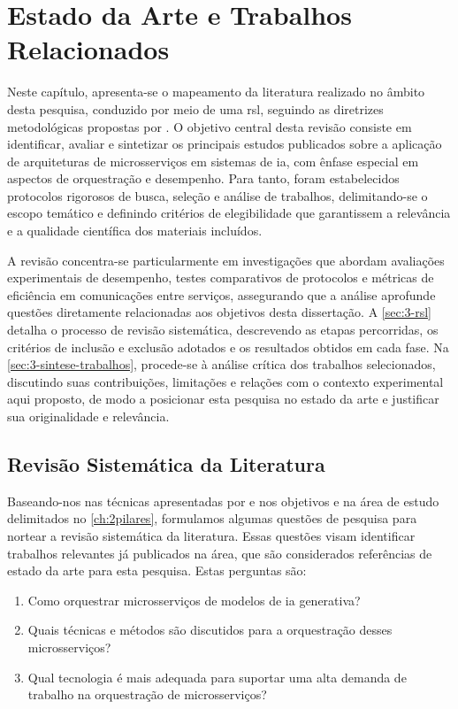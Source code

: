 \chapter{Estado da Arte e Trabalhos Relacionados}
\label{ch:3estado_da_arte}

Neste capítulo, apresenta-se o mapeamento da literatura realizado no âmbito desta pesquisa, conduzido por meio de uma \acrfull{rsl}, seguindo as diretrizes metodológicas propostas por \textcite{scannavino_revisao_2017}. O objetivo central desta revisão consiste em identificar, avaliar e sintetizar os principais estudos publicados sobre a aplicação de arquiteturas de microsserviços em sistemas de \acrfull{ia}, com ênfase especial em aspectos de orquestração e desempenho. Para tanto, foram estabelecidos protocolos rigorosos de busca, seleção e análise de trabalhos, delimitando-se o escopo temático e definindo critérios de elegibilidade que garantissem a relevância e a qualidade científica dos materiais incluídos.

A revisão concentra-se particularmente em investigações que abordam avaliações experimentais de desempenho, testes comparativos de protocolos e métricas de eficiência em comunicações entre serviços, assegurando que a análise aprofunde questões diretamente relacionadas aos objetivos desta dissertação. A \autoref{sec:3-rsl} detalha o processo de revisão sistemática, descrevendo as etapas percorridas, os critérios de inclusão e exclusão adotados e os resultados obtidos em cada fase. Na \autoref{sec:3-sintese-trabalhos}, procede-se à análise crítica dos trabalhos selecionados, discutindo suas contribuições, limitações e relações com o contexto experimental aqui proposto, de modo a posicionar esta pesquisa no estado da arte e justificar sua originalidade e relevância.

\section{Revisão Sistemática da Literatura}
\label{sec:3-rsl}

Baseando-nos nas técnicas apresentadas por \textcite{scannavino_revisao_2017} e nos objetivos e na área de estudo delimitados no \autoref{ch:2pilares}, formulamos algumas questões de pesquisa para nortear a revisão sistemática da literatura. Essas questões visam identificar trabalhos relevantes já publicados na área, que são considerados referências de estado da arte para esta pesquisa. Estas perguntas são:

\begin{enumerate}
    \item  Como orquestrar microsserviços de modelos de \gls{ia} generativa?
    \item  Quais técnicas e métodos são discutidos para a orquestração desses microsserviços?
    \item  Qual tecnologia é mais adequada para suportar uma alta demanda de trabalho na orquestração de microsserviços?
\end{enumerate}

